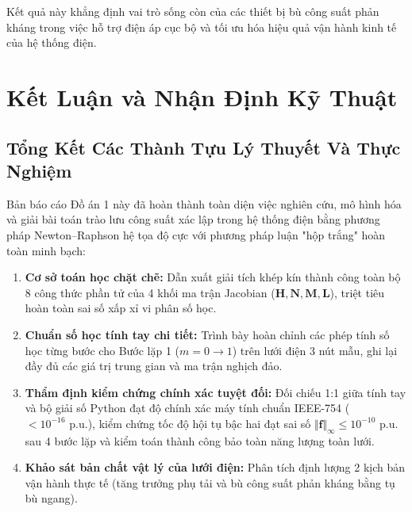 \documentclass[12pt,a4paper,oneside]{report}
\begin{document}
\begin{table}[H]
\centering
\caption{Hiệu quả kỹ thuật khi lắp đặt tụ bù ngang tại thanh cái phụ tải 3.}
\label{tab:shunt_compensation}
\end{table}

Kết quả này khẳng định vai trò sống còn của các thiết bị bù công suất phản kháng trong việc hỗ trợ điện áp cục bộ và tối ưu hóa hiệu quả vận hành kinh tế của hệ thống điện.

\chapter{Kết Luận và Nhận Định Kỹ Thuật}

\section{Tổng Kết Các Thành Tựu Lý Thuyết Và Thực Nghiệm}
Bản báo cáo Đồ án 1 này đã hoàn thành toàn diện việc nghiên cứu, mô hình hóa và giải bài toán trào lưu công suất xác lập trong hệ thống điện bằng phương pháp Newton--Raphson hệ tọa độ cực với phương pháp luận "hộp trắng" hoàn toàn minh bạch:
\begin{enumerate}
    \item \textbf{Cơ sở toán học chặt chẽ:} Dẫn xuất giải tích khép kín thành công toàn bộ 8 công thức phần tử của 4 khối ma trận Jacobian ($\mathbf{H}, \mathbf{N}, \mathbf{M}, \mathbf{L}$), triệt tiêu hoàn toàn sai số xấp xỉ vi phân số học.
    \item \textbf{Chuẩn số học tính tay chi tiết:} Trình bày hoàn chỉnh các phép tính số học từng bước cho Bước lặp 1 ($m = 0 \to 1$) trên lưới điện 3 nút mẫu, ghi lại đầy đủ các giá trị trung gian và ma trận nghịch đảo.
    \item \textbf{Thẩm định kiểm chứng chính xác tuyệt đối:} Đối chiếu 1:1 giữa tính tay và bộ giải số Python đạt độ chính xác máy tính chuẩn IEEE-754 ($< 10^{-16}\text{ p.u.}$), kiểm chứng tốc độ hội tụ bậc hai đạt sai số $\Vert \mathbf{f} \Vert_\infty \le 10^{-10}\text{ p.u.}$ sau 4 bước lặp và kiểm toán thành công bảo toàn năng lượng toàn lưới.
    \item \textbf{Khảo sát bản chất vật lý của lưới điện:} Phân tích định lượng 2 kịch bản vận hành thực tế (tăng trưởng phụ tải và bù công suất phản kháng bằng tụ bù ngang).
\end{enumerate}
\end{document}
